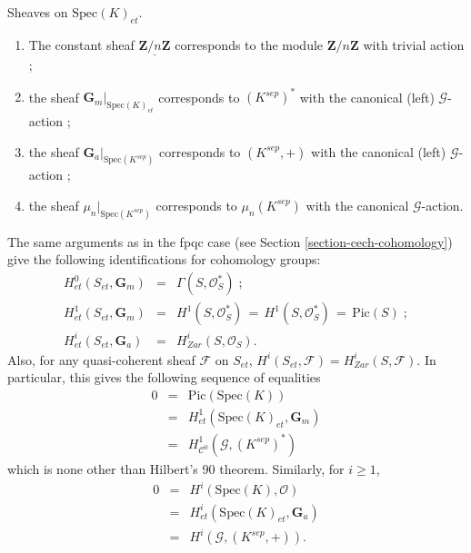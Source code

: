 \begin{example}
\label{example-sheaves-point}
Sheaves on $\text{Spec}(K)_{et}$.
\begin{enumerate}
\item The constant sheaf $\underline{\mathbf{Z}/n\mathbf{Z}}$ corresponds to 
the module $\mathbf{Z}/n\mathbf{Z}$ with trivial action ; 
\item the sheaf $\mathbf{G}_m|_{\text{Spec}(K)_{et}}$ corresponds to 
$(K^{sep})^*$ with the canonical (left) $\mathcal{G}$-action ;
\item the sheaf $\mathbf{G}_a|_{\text{Spec}(K^{sep})}$ corresponds to 
$(K^{sep}, +)$ with the canonical (left) $\mathcal{G}$-action ;
\item the sheaf $\mu_n|_{\text{Spec}(K^{sep})}$ corresponds to $\mu_n(K^{sep})$ 
with the canonical $\mathcal{G}$-action.
\end{enumerate}

\noindent
The same arguments as in the fpqc case (see
Section \ref{section-cech-cohomology})
give the following identifications for cohomology groups:
$$
\begin{matrix}
H_{et}^0(S_{et}, \mathbf{G}_m) & = & \Gamma(S, \mathcal{O}_S^*) \; ; \\
H_{et}^1(S_{et}, \mathbf{G}_m) & = & H^1(S, \mathcal{O}_S^*) \, = \,  H^1(S, 
\mathcal{O}_S^*) \, = \, \text{Pic}(S) \; ;\\
H_{et}^i(S_{et}, \mathbf{G}_a) & = & H_{Zar}^i(S, \mathcal{O}_S).
\end{matrix}
$$
Also, for any quasi-coherent sheaf $\mathcal{F}$ on $S_{et}$, $H^i(S_{et}, 
\mathcal{F}) = H_{Zar}^i(S, \mathcal{F})$.
In particular, this gives the following sequence of equalities
\begin{eqnarray*}
0 & = & \text{Pic}(\text{Spec}(K)) \\
& = & H_{et}^1(\text{Spec}(K)_{et}, \mathbf{G}_m) \\
& = & H^1_{\mathcal{C}^0}(\mathcal{G}, (K^{sep})^*) 
\end{eqnarray*}
which is none other than Hilbert's 90 theorem. Similarly, for $i \geq 1$,
\begin{eqnarray*}
0 & = & H^i(\text{Spec}(K), \mathcal{O}) \\
&  = & H_{et}^i(\text{Spec}(K)_{et}, \mathbf{G}_a) \\
& = & H^i(\mathcal{G}, (K^{sep}, +)).
\end{eqnarray*}
\end{example}





